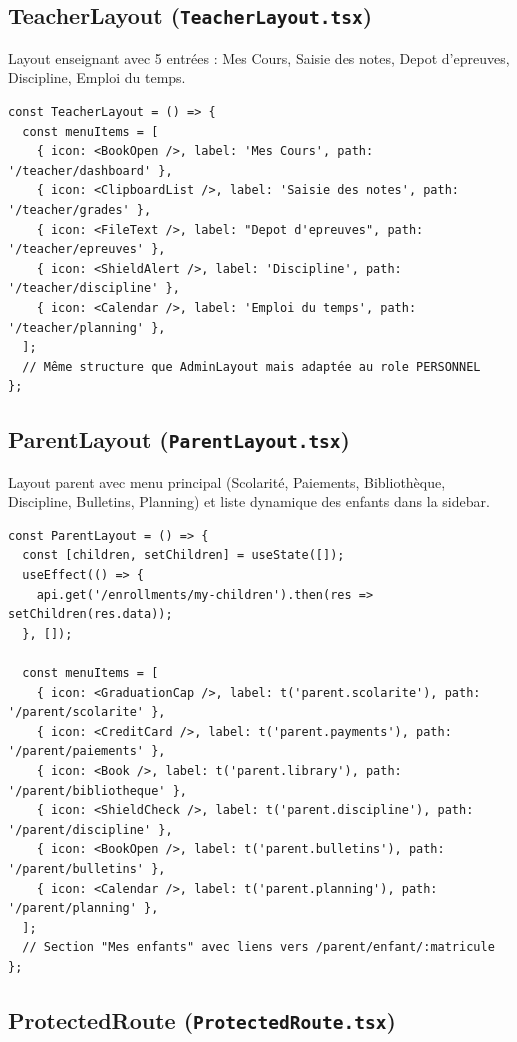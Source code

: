 \documentclass[12pt,a4paper]{article}
\begin{document}
\subsection{TeacherLayout (\texttt{TeacherLayout.tsx})}

Layout enseignant avec 5 entrées : Mes Cours, Saisie des notes, Depot d'epreuves, Discipline, Emploi du temps.

\begin{lstlisting}[style=code]
const TeacherLayout = () => {
  const menuItems = [
    { icon: <BookOpen />, label: 'Mes Cours', path: '/teacher/dashboard' },
    { icon: <ClipboardList />, label: 'Saisie des notes', path: '/teacher/grades' },
    { icon: <FileText />, label: "Depot d'epreuves", path: '/teacher/epreuves' },
    { icon: <ShieldAlert />, label: 'Discipline', path: '/teacher/discipline' },
    { icon: <Calendar />, label: 'Emploi du temps', path: '/teacher/planning' },
  ];
  // Même structure que AdminLayout mais adaptée au role PERSONNEL
};
\end{lstlisting}

\subsection{ParentLayout (\texttt{ParentLayout.tsx})}

Layout parent avec menu principal (Scolarité, Paiements, Bibliothèque, Discipline, Bulletins, Planning) et liste dynamique des enfants dans la sidebar.

\begin{lstlisting}[style=code]
const ParentLayout = () => {
  const [children, setChildren] = useState([]);
  useEffect(() => {
    api.get('/enrollments/my-children').then(res => setChildren(res.data));
  }, []);

  const menuItems = [
    { icon: <GraduationCap />, label: t('parent.scolarite'), path: '/parent/scolarite' },
    { icon: <CreditCard />, label: t('parent.payments'), path: '/parent/paiements' },
    { icon: <Book />, label: t('parent.library'), path: '/parent/bibliotheque' },
    { icon: <ShieldCheck />, label: t('parent.discipline'), path: '/parent/discipline' },
    { icon: <BookOpen />, label: t('parent.bulletins'), path: '/parent/bulletins' },
    { icon: <Calendar />, label: t('parent.planning'), path: '/parent/planning' },
  ];
  // Section "Mes enfants" avec liens vers /parent/enfant/:matricule
};
\end{lstlisting}

\subsection{ProtectedRoute (\texttt{ProtectedRoute.tsx})}
\end{document}
